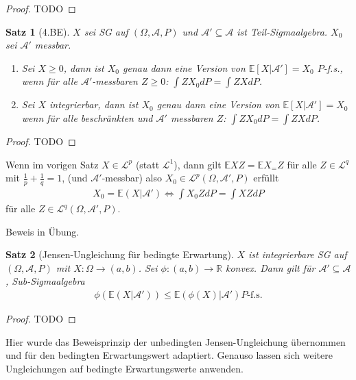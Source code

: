 \documentclass[]{article}
\newtheorem{theorem}{Satz}
\begin{document}
\begin{proof}
	TODO
\end{proof}

\begin{theorem}[4.BE]
	$X$ sei SG auf $(\Omega, \mathcal{A}, P)$ und $\mathcal{A}' \subseteq \mathcal{A}$ ist Teil-Sigmaalgebra. $X_0$ sei $\mathcal{A}'$ messbar.
	\begin{enumerate}
		\item Sei $X\geq 0$, dann ist $X_0$ genau dann eine Version von $\mathbb{E}[X|\mathcal{A}'] = X_0$ $P$-f.s., wenn für alle $\mathcal{A}'$-messbaren $Z\geq 0$: $\int ZX_0 dP = \int ZX dP$.
		\item Sei $X$ integrierbar, dann ist $X_0$ genau dann eine Version von $\mathbb{E}[X|\mathcal{A}']=X_0$ wenn für alle beschränkten und $\mathcal{A}'$ messbaren $Z$: $\int ZX_0 dP = \int ZX dP$.
	\end{enumerate}
\end{theorem}

\begin{proof}
	TODO
\end{proof}

Wenn im vorigen Satz $X \in \mathcal{L}^p$ (statt $\mathcal{L}^1$), dann gilt $\mathbb{E}XZ = \mathbb{E}X_= Z$ für alle $Z\in \mathcal{L}^q$ mit $\frac{1}{p} + \frac{1}{q} = 1$, (und $\mathcal{A}'$-messbar) also $X_0 \in \mathcal{L}^p(\Omega, \mathcal{A}', P)$ erfüllt
\begin{align*}
	X_0 = \mathbb{E}(X|\mathcal{A}') \iff \int X_0 Z dP = \int XZ dP
\end{align*}
für alle $Z \in \mathcal{L}^q(\Omega, \mathcal{A}', P)$.

Beweis in Übung.

\begin{theorem}[Jensen-Ungleichung für bedingte Erwartung]
	$X$ ist integrierbare SG auf $(\Omega, \mathcal{A}, P)$ mit $X:\Omega\rightarrow(a,b)$. Sei $\phi:(a,b)\rightarrow\mathbb{R}$ konvex. Dann gilt für $\mathcal{A}' \subseteq \mathcal{A}$, Sub-Sigmaalgebra
	\begin{align*}
		\phi(\mathbb{E}(X|\mathcal{A}')) \leq \mathbb{E}(\phi(X)|\mathcal{A}') P\text{-f.s.}
	\end{align*}
\end{theorem}

\begin{proof}
	TODO
\end{proof}

Hier wurde das Beweisprinzip der unbedingten Jensen-Ungleichung übernommen und für den bedingten Erwartungswert adaptiert. Genauso lassen sich weitere Ungleichungen auf bedingte Erwartungswerte anwenden.
\end{document}
